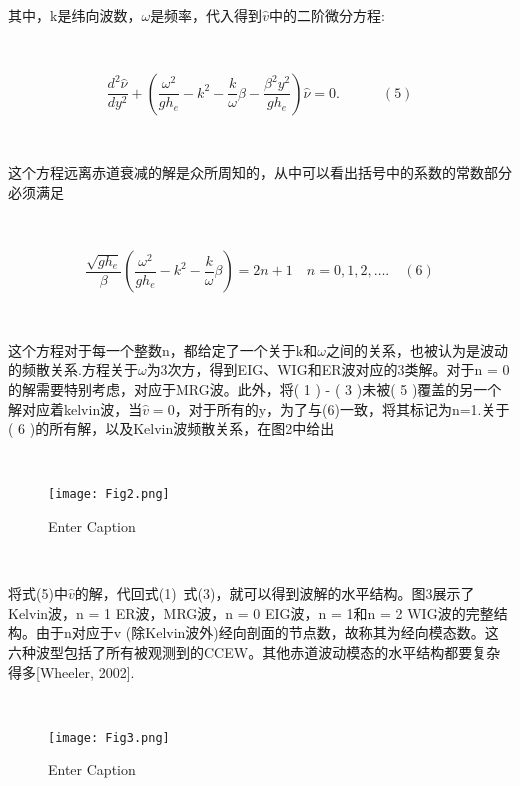 \documentclass{article}
\begin{document}
\begin{CJK*}{UTF8}{gbsn}
\ 

其中，k是纬向波数，$\omega$是频率，代入得到$\hat{v}$中的二阶微分方程:


\ 

\[\left.\frac{d^2\hat{\nu}}{dy^2}+\left(\frac{\omega^2}{gh_e}-k^2-\frac k\omega\right.\beta-\frac{\beta^2y^2}{gh_e}\right)\hat{\nu}=0.\quad\quad\quad(5)\]


\ 

这个方程远离赤道衰减的解是众所周知的，从中可以看出括号中的系数的常数部分必须满足


\ 

\[\frac{\sqrt{gh_e}}\beta\left(\frac{\omega^2}{gh_e}-k^2-\frac k\omega\beta\right)=2n+1\quad n=0,1,2,\ldots.\quad(6)\]

\ 

这个方程对于每一个整数n，都给定了一个关于k和$\omega$之间的关系，也被认为是波动的频散关系.方程关于$\omega$为3次方，得到EIG、WIG和ER波对应的3类解。对于n = 0的解需要特别考虑，对应于MRG波。此外，将( 1 ) - ( 3 )未被( 5 )覆盖的另一个解对应着kelvin波，当$\hat{v} =0$，对于所有的y，为了与(6)一致，将其标记为n=1.关于( 6 )的所有解，以及Kelvin波频散关系，在图2中给出


\ 

\begin{figure}
    \centering
    \texttt{[image: Fig2.png]}
    \caption{Enter Caption}
    \label{fig:enter-label}
\end{figure}


\ 

将式(5)中$\hat{v}$的解，代回式(1)~式(3)，就可以得到波解的水平结构。图3展示了Kelvin波，n = 1 ER波，MRG波，n = 0 EIG波，n = 1和n = 2 WIG波的完整结构。由于n对应于v (除Kelvin波外)经向剖面的节点数，故称其为经向模态数。这六种波型包括了所有被观测到的CCEW。其他赤道波动模态的水平结构都要复杂得多[Wheeler, 2002].


\ 

\begin{figure}
    \centering
    \texttt{[image: Fig3.png]}
    \caption{Enter Caption}
    \label{fig:enter-label}
\end{figure}


\ 



\end{CJK*}
\end{document}
